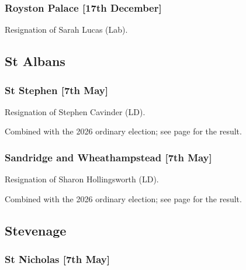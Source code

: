 \documentclass[a4paper,openany]{book}
\begin{document}
\begin{resultsiii}
\subsubsection*{Royston Palace \hspace*{\fill}\nolinebreak[1]%
	\enspace\hspace*{\fill}
	[17th December]}


Resignation of Sarah Lucas (Lab).

\subsection*{St Albans}

\subsubsection*{St Stephen \hspace*{\fill}\nolinebreak[1]%
	\enspace\hspace*{\fill}
	[7th May]}


Resignation of Stephen Cavinder (LD).

Combined with the 2026 ordinary election; see page \pageref{StStephenStAlbans} for the result.

\subsubsection*{Sandridge and Wheathampstead \hspace*{\fill}\nolinebreak[1]%
	\enspace\hspace*{\fill}
	[7th May]}


Resignation of Sharon Hollingsworth (LD).

Combined with the 2026 ordinary election; see page \pageref{SandridgeWheathampsteadStAlbans} for the result.

\subsection*{Stevenage}

\subsubsection*{St Nicholas \hspace*{\fill}\nolinebreak[1]%
	\enspace\hspace*{\fill}
	[7th May]}


\end{resultsiii}
\end{document}

